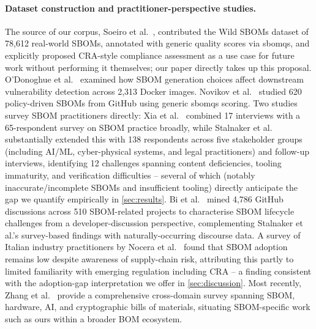 \documentclass[11pt]{article}
\begin{document}
\paragraph{Dataset construction and practitioner-perspective studies.} The source of our corpus, Soeiro et al.\ \cite{soeiro2025}, contributed the Wild SBOMs dataset of 78,612 real-world SBOMs, annotated with generic quality scores via sbomqs, and explicitly proposed CRA-style compliance assessment as a use case for future work without performing it themselves; our paper directly takes up this proposal. O'Donoghue et al.\ \cite{odonoghue2024} examined how SBOM generation choices affect downstream vulnerability detection across 2,313 Docker images. Novikov et al.\ \cite{novikov2025} studied 620 policy-driven SBOMs from GitHub using generic sbomqs scoring. Two studies survey SBOM practitioners directly: Xia et al.\ \cite{xia2023} combined 17 interviews with a 65-respondent survey on SBOM practice broadly, while Stalnaker et al.\ \cite{stalnaker2024} substantially extended this with 138 respondents across five stakeholder groups (including AI/ML, cyber-physical systems, and legal practitioners) and follow-up interviews, identifying 12 challenges spanning content deficiencies, tooling immaturity, and verification difficulties -- several of which (notably inaccurate/incomplete SBOMs and insufficient tooling) directly anticipate the gap we quantify empirically in \cref{sec:results}. Bi et al.\ \cite{bi2024} mined 4,786 GitHub discussions across 510 SBOM-related projects to characterise SBOM lifecycle challenges from a developer-discussion perspective, complementing Stalnaker et al.'s survey-based findings with naturally-occurring discourse data. A survey of Italian industry practitioners by Nocera et al.\ \cite{nocera2024icsme} found that SBOM adoption remains low despite awareness of supply-chain risk, attributing this partly to limited familiarity with emerging regulation including CRA -- a finding consistent with the adoption-gap interpretation we offer in \cref{sec:discussion}. Most recently, Zhang et al.\ \cite{zhang2026} provide a comprehensive cross-domain survey spanning SBOM, hardware, AI, and cryptographic bills of materials, situating SBOM-specific work such as ours within a broader BOM ecosystem.
\end{document}
